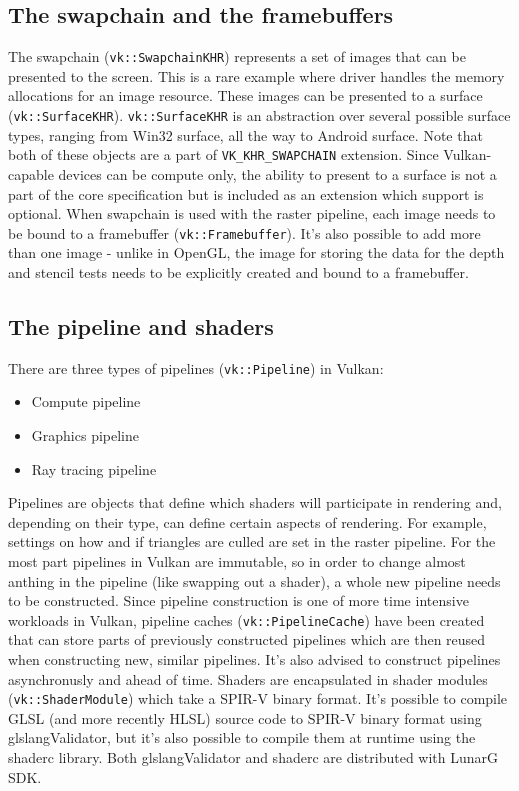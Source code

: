 \documentclass[times, utf8, zavrsni, numeric]{fer}
\begin{document}
\subsection{The swapchain and the framebuffers}
The swapchain (\texttt{vk::SwapchainKHR}) represents a set of images that can be presented to the screen. This is a rare example where driver handles the memory allocations for an image resource. These images can be presented to a surface (\texttt{vk::SurfaceKHR}). \texttt{vk::SurfaceKHR} is an abstraction over several possible surface types, ranging from Win32 surface, all the way to Android surface. Note that both of these objects are a part of \texttt{VK\_KHR\_SWAPCHAIN} extension. Since Vulkan-capable devices can be compute only, the ability to present to a surface is not a part of the core specification but is included as an extension which support is optional. When swapchain is used with the raster pipeline, each image needs to be bound to a framebuffer (\texttt{vk::Framebuffer}). It's also possible to add more than one image - unlike in OpenGL, the image for storing the data for the depth and stencil tests needs to be explicitly created and bound to a framebuffer.  

\subsection{The pipeline and shaders}
There are three types of pipelines (\texttt{vk::Pipeline}) in Vulkan:
\begin{itemize}
	\item{Compute pipeline}
	\item{Graphics pipeline}
	\item{Ray tracing pipeline}
\end{itemize}

Pipelines are objects that define which shaders will participate in rendering and, depending on their type, can define certain aspects of rendering. For example, settings on how and if triangles are culled are set in the raster pipeline. For the most part pipelines in Vulkan are immutable, so in order to change almost anthing in the pipeline (like swapping out a shader), a whole new pipeline needs to be constructed. Since pipeline construction is one of more time intensive workloads in Vulkan, pipeline caches (\texttt{vk::PipelineCache}) have been created that can store parts of previously constructed pipelines which are then reused when constructing new, similar pipelines. It's also advised to construct pipelines asynchronusly and ahead of time.
Shaders are encapsulated in shader modules (\texttt{vk::ShaderModule}) which take a SPIR-V binary format. It's possible to compile GLSL (and more recently HLSL) source code to SPIR-V binary format using glslangValidator, but it's also possible to compile them at runtime using the shaderc library. Both glslangValidator and shaderc are distributed with LunarG SDK.
\end{document}
